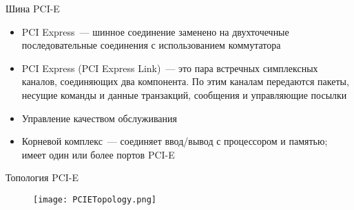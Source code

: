 \documentclass[aspectratio=169,14pt]{beamer}
\begin{document}
\begin{frame}{Шина PCI-E}
    \begin{itemize}
        \item PCI Express~--- шинное соединение заменено
        на двухточечные последовательные соединения с
        использованием коммутатора
        \item PCI Express (PCI Express Link)~--- это пара встречных
        симплексных каналов, соединяющих два компонента. По этим
        каналам передаются пакеты, несущие команды и данные
        транзакций, сообщения и управляющие посылки
        \item Управление качеством обслуживания
        \item Корневой комплекс~--- соединяет ввод/вывод с
        процессором и памятью; имеет один или более портов PCI-E
    \end{itemize}
\end{frame}

\begin{frame}{Топология PCI-E}
    \begin{figure}
        \centering
        \texttt{[image: PCIETopology.png]}
    \end{figure}
\end{frame}
\end{document}
